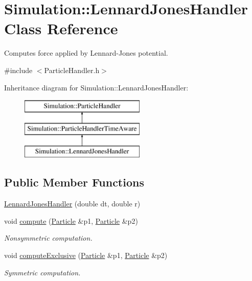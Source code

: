 \hypertarget{classSimulation_1_1LennardJonesHandler}{\section{Simulation\-:\-:Lennard\-Jones\-Handler Class Reference}
\label{classSimulation_1_1LennardJonesHandler}
}


Computes force applied by Lennard-\/\-Jones potential.  




{\ttfamily \#include $<$Particle\-Handler.\-h$>$}

Inheritance diagram for Simulation\-:\-:Lennard\-Jones\-Handler\-:\begin{figure}[H]
\begin{center}
\leavevmode
\includegraphics[height=3.000000cm]{classSimulation_1_1LennardJonesHandler}
\end{center}
\end{figure}
\subsection*{Public Member Functions}
\begin{DoxyCompactItemize}
\item 
\hyperlink{classSimulation_1_1LennardJonesHandler_ab42ec6d50cb81143d872676e24c49800}{Lennard\-Jones\-Handler} (double dt, double r)
\item 
void \hyperlink{classSimulation_1_1LennardJonesHandler_a81842168e68a61cb75448f91bc27f99c}{compute} (\hyperlink{classSimulation_1_1Particle}{Particle} \&p1, \hyperlink{classSimulation_1_1Particle}{Particle} \&p2)
\begin{DoxyCompactList}\small\item\em Nonsymmetric computation. \end{DoxyCompactList}\item 
void \hyperlink{classSimulation_1_1LennardJonesHandler_ac16127a588f6e8598dc2598d1224517f}{compute\-Exclusive} (\hyperlink{classSimulation_1_1Particle}{Particle} \&p1, \hyperlink{classSimulation_1_1Particle}{Particle} \&p2)
\begin{DoxyCompactList}\small\item\em Symmetric computation. \end{DoxyCompactList}\end{DoxyCompactItemize}

